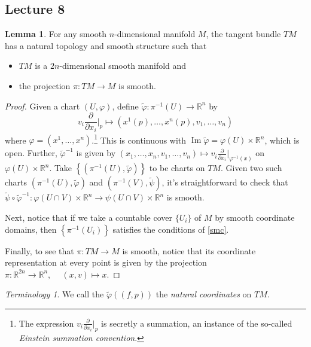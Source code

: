 \documentclass[10pt,letterpaper,cm]{nupset}
\theoremstyle{definition}
\theoremstyle{theorem}
\newtheorem{lemma}[definition]{Lemma}
\theoremstyle{remark}
\newtheorem*{term}{Terminology}
\DeclareMathOperator{\Ima}{Im}
\newcommand{\R}{\mathbb R}
\newcommand{\1}{\mathbf{1}}
\newcommand{\0}{\vec 0}
\begin{document}
\subsection{Lecture 8}

\begin{lemma}
For any smooth $n$-dimensional manifold $M$, the tangent bundle $TM$ has a natural topology and smooth structure such that 
\begin{itemize}
\item $TM$ is a $2n$-dimensional smooth manifold and 
\item the projection $\pi : TM \to M$ is smooth.
\end{itemize}
\end{lemma}
\begin{proof}
Given a chart $(U, \varphi)$, define $\tilde{\varphi}: \pi^{-1}(U) \to \R^n$ by $$v_i\frac{\partial}{\partial{x_i}}\bigr\rvert_p \mapsto \left(x^1(p), \ldots, x^n(p), v_1, \ldots, v_n\right)$$ where $\varphi = (x^1, \ldots, x^n)$.\footnote{The expression $v_i\frac{\partial}{\partial{x_i}}\bigr\rvert_p$ is secretly a summation, an instance of the so-called \textit{Einstein summation convention}.}
This is continuous with $\Ima \tilde{\varphi} = \varphi(U) \times \R^n$, which is open. Further, $\tilde{\varphi}^{-1}$ is given by $\left(x_1, \ldots, x_n, v_1, \ldots, v_n\right)\mapsto v_i \frac{\partial}{\partial{x_i}}\bigr\rvert_{\varphi^{-1}(x)}$ on  $\varphi(U) \times \R^n$. Take $\left\{\left(\pi^{-1}(U), \tilde{\varphi}\right)\right\}$ to be charts on $TM$. Given two such charts $\left(\pi^{-1}(U), \tilde{\varphi}\right)$ and $\left(\pi^{-1}(V), \tilde{\psi}\right)$, it's straightforward to check that $\tilde{\psi} \circ \tilde{\varphi}^{-1}: \varphi(U \cap V)\times \R^n \to \psi(U \cap V)\times \R^n$ is smooth.

\medskip


Next, notice that if we take a countable cover $\{U_i\}$ of $M$ by smooth coordinate domains, then $\left\{\pi^{-1}(U_i)\right\}$ satisfies the conditions of \cref{smc}.

\medskip


Finally, to see that $\pi : TM \to M$ is smooth, notice that its coordinate representation at every point is given by the projection $\pi:\R^{2n} \to \R^n, \ \quad (x,v) \mapsto x$.
\end{proof}

\begin{term}
We call the $\tilde{\varphi}\left((f, p)\right)$ the \textit{natural coordinates} on $TM$.
\end{term}
\end{document}
